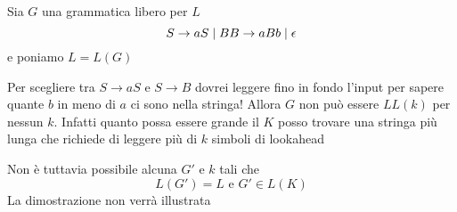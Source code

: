 Sia $G$ una grammatica libero per $L$
\[
    S\to aS\mid B \\
    B\to aBb \mid \epsilon    
\]
e poniamo $L=L(G)$


Per scegliere tra $S\to aS$ e $S\to B$ dovrei leggere fino in fondo l'input per sapere quante $b$ in meno di $a$ ci sono nella stringa! Allora $G$ non può essere $LL(k)$ per nessun $k$. Infatti quanto possa essere grande il $K$ posso trovare una stringa più lunga che richiede di leggere più di $k$ simboli di lookahead

Non è tuttavia possibile alcuna $G'$ e $k$ tali che
\[
    L(G') = L \text{ e }G'\in L(K)    
\]
La dimostrazione non verrà illustrata 
